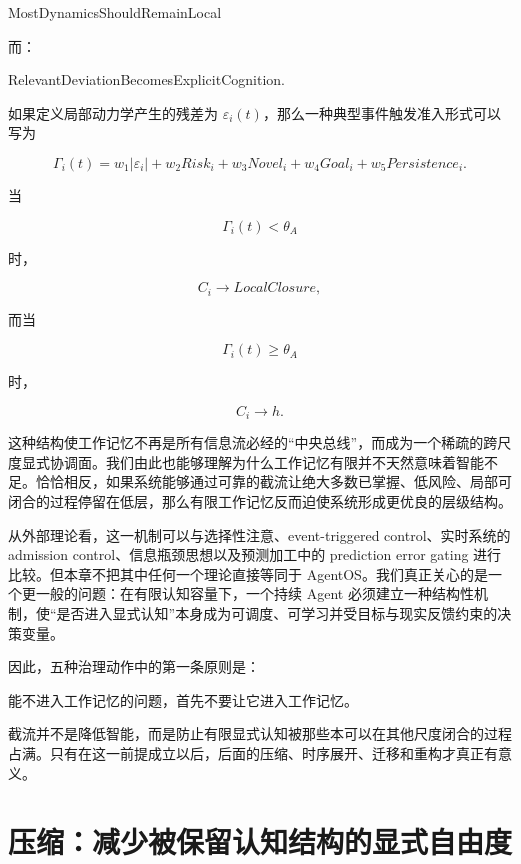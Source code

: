 \begin{statementbox}
MostDynamicsShouldRemainLocal
\end{statementbox}

而：

\begin{statementbox}
RelevantDeviationBecomesExplicitCognition.
\end{statementbox}

如果定义局部动力学产生的残差为 $\varepsilon_i(t)$，那么一种典型事件触发准入形式可以写为

\[
\Gamma_i(t)
=
w_1|\varepsilon_i|
+
w_2 Risk_i
+
w_3 Novel_i
+
w_4 Goal_i
+
w_5 Persistence_i.
\]

当

\[
\Gamma_i(t)<\theta_A
\]

时，

\[
C_i
\rightarrow
LocalClosure,
\]

而当

\[
\Gamma_i(t)\geq\theta_A
\]

时，

\[
C_i
\rightarrow
h.
\]

这种结构使工作记忆不再是所有信息流必经的“中央总线”，而成为一个稀疏的跨尺度显式协调面。我们由此也能够理解为什么工作记忆有限并不天然意味着智能不足。恰恰相反，如果系统能够通过可靠的截流让绝大多数已掌握、低风险、局部可闭合的过程停留在低层，那么有限工作记忆反而迫使系统形成更优良的层级结构。

从外部理论看，这一机制可以与选择性注意、event-triggered control、实时系统的 admission control、信息瓶颈思想以及预测加工中的 prediction error gating 进行比较。但本章不把其中任何一个理论直接等同于 AgentOS。我们真正关心的是一个更一般的问题：在有限认知容量下，一个持续 Agent 必须建立一种结构性机制，使“是否进入显式认知”本身成为可调度、可学习并受目标与现实反馈约束的决策变量。

因此，五种治理动作中的第一条原则是：

\begin{proposition*}
能不进入工作记忆的问题，首先不要让它进入工作记忆。
\end{proposition*}

截流并不是降低智能，而是防止有限显式认知被那些本可以在其他尺度闭合的过程占满。只有在这一前提成立以后，后面的压缩、时序展开、迁移和重构才真正有意义。

\section{压缩：减少被保留认知结构的显式自由度}

